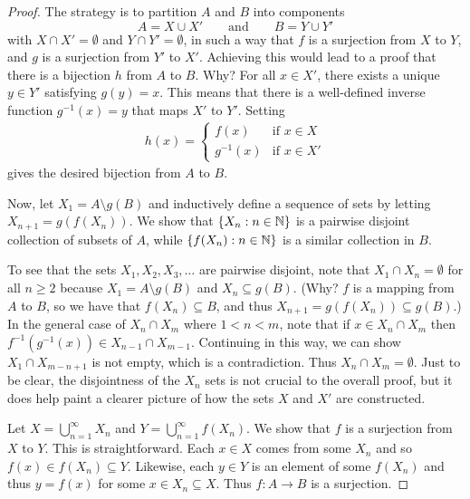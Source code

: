 \documentclass[11pt,twoside=off,numbers=noenddot]{scrbook}
\begin{document}
\begin{proof}
  The strategy is to partition $A$ and $B$ into components
  \[ A = X \cup X' \qquad \text{and} \qquad B = Y \cup Y' \]
  with $X \cap X' = \emptyset$ and $Y \cap Y' = \emptyset$, in such a
  way that $f$ is a surjection from $X$ to $Y$, and $g$ is a
  surjection from $Y'$ to $X'$. Achieving this would lead to a proof
  that there is a bijection $h$ from $A$ to $B$. Why? For all $x \in
  X'$, there exists a unique $y \in Y'$ satisfying $g(y) = x$. This
  means that there is a well-defined inverse function $g^{-1}(x) = y$
  that maps $X'$ to $Y'$. Setting
  \begin{align*}
    h(x) =
    \begin{cases}
      f(x) & \text{if $x \in X$} \\
      g^{-1}(x) & \text{if $x \in X'$}
    \end{cases}
  \end{align*}
  gives the desired bijection from $A$ to $B$.

  Now, let $X_1 = A \setminus g(B)$ and inductively define a sequence
  of sets by letting $X_{n + 1} = g(f(X_n))$. We show that $\{ X_n
  : n \in \mathbb N \}$ is a pairwise disjoint collection of subsets of $A$,
  while $\{ f(X_n) : n \in \mathbb N \}$ is a similar collection in $B$.

  To see that the sets $X_1, X_2, X_3, \dots$ are pairwise disjoint,
  note that $X_1 \cap X_n = \emptyset$ for all $n \geq 2$ because
  $X_1 = A \setminus g(B)$ and $X_n \subseteq g(B)$. (Why? $f$ is a
    mapping from $A$ to $B$, so we have that $f(X_n) \subseteq B$, and
  thus $X_{n + 1} = g(f(X_n)) \subseteq g(B)$.) In the general case
  of $X_n \cap X_m$ where $1 < n < m$, note that if $x \in X_n \cap
  X_m$ then $f^{-1}(g^{-1}(x)) \in X_{n - 1} \cap X_{m - 1}$.
  Continuing in this way, we can show $X_1 \cap X_{m - n + 1}$ is not
  empty, which is a contradiction. Thus $X_n \cap X_m = \emptyset$.
  Just to be clear, the disjointness of the $X_n$ sets is not crucial
  to the overall proof, but it does help paint a clearer picture of
  how the sets $X$ and $X'$ are constructed.

  Let $X = \bigcup_{n = 1}^{\infty} X_n$ and $Y = \bigcup_{n =
  1}^{\infty} f(X_n)$. We show that $f$ is a surjection from $X$ to
  $Y$. This is straightforward. Each $x \in X$ comes from some $X_n$
  and so $f(x) \in f(X_n) \subseteq Y$. Likewise, each $y \in Y$ is
  an element of some $f(X_n)$ and thus $y = f(x)$ for some $x \in X_n
  \subseteq X$. Thus $f : A \to B$ is a surjection.


\end{proof}
\end{document}
